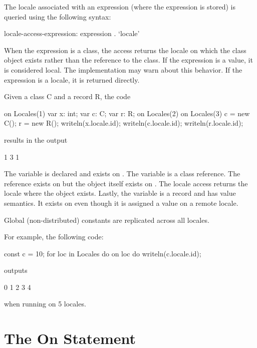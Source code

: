 The locale associated with an expression (where the expression is
stored) is queried using the following syntax:
\begin{syntax}
locale-access-expression:
  expression . `locale'
\end{syntax}
When the expression is a class, the access returns the locale on which
the class object exists rather than the reference to the class.  If
the expression is a value, it is considered local.  The implementation
may warn about this behavior.  If the expression is a locale, it is
returned directly.

\begin{example}
Given a class C and a record R, the code
\begin{chapel}
on Locales(1) {
  var x: int;
  var c: C;
  var r: R;
  on Locales(2) {
    on Locales(3) {
      c = new C();
      r = new R();
    }
    writeln(x.locale.id);
    writeln(c.locale.id);
    writeln(r.locale.id);
  }
}
\end{chapel}
results in the output
\begin{chapel}
1
3
1
\end{chapel}
The variable  is declared and exists on .
The variable  is a class reference.  The reference exists
on  but the object itself exists
on .  The locale access returns the locale where the
object exists.  Lastly, the variable  is a record and has
value semantics.  It exists on  even though it is
assigned a value on a remote locale.
\end{example}

Global (non-distributed) constants are replicated across all locales.
\begin{example}
For example, the following code:
%
%
\begin{chapel}
const c = 10;
for loc in Locales do on loc do
    writeln(c.locale.id);
\end{chapel}
outputs
\begin{chapel}
0
1
2
3
4
\end{chapel}
when running on 5 locales.
\end{example}


\section{The On Statement}
\label{On}

